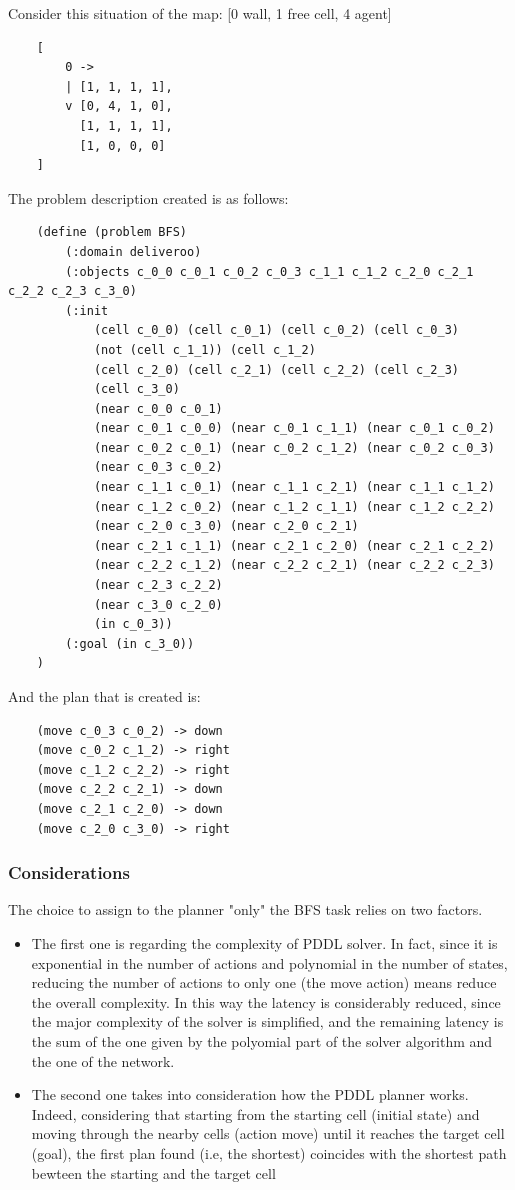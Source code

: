 \documentclass[a4paper, 11pt]{article}
\begin{document}
Consider this situation of the map: [0 wall, 1 free cell, 4 agent]
\begin{verbatim}
    [
        0 ->
        | [1, 1, 1, 1],
        v [0, 4, 1, 0],
          [1, 1, 1, 1],
          [1, 0, 0, 0]
    ]
\end{verbatim}

The problem description created is as follows:
\begin{verbatim}
    (define (problem BFS)
        (:domain deliveroo)
        (:objects c_0_0 c_0_1 c_0_2 c_0_3 c_1_1 c_1_2 c_2_0 c_2_1 c_2_2 c_2_3 c_3_0)
        (:init 
            (cell c_0_0) (cell c_0_1) (cell c_0_2) (cell c_0_3)
            (not (cell c_1_1)) (cell c_1_2)
            (cell c_2_0) (cell c_2_1) (cell c_2_2) (cell c_2_3)
            (cell c_3_0)
            (near c_0_0 c_0_1)
            (near c_0_1 c_0_0) (near c_0_1 c_1_1) (near c_0_1 c_0_2)
            (near c_0_2 c_0_1) (near c_0_2 c_1_2) (near c_0_2 c_0_3)
            (near c_0_3 c_0_2)
            (near c_1_1 c_0_1) (near c_1_1 c_2_1) (near c_1_1 c_1_2)
            (near c_1_2 c_0_2) (near c_1_2 c_1_1) (near c_1_2 c_2_2)
            (near c_2_0 c_3_0) (near c_2_0 c_2_1)
            (near c_2_1 c_1_1) (near c_2_1 c_2_0) (near c_2_1 c_2_2)
            (near c_2_2 c_1_2) (near c_2_2 c_2_1) (near c_2_2 c_2_3)
            (near c_2_3 c_2_2)
            (near c_3_0 c_2_0)
            (in c_0_3))
        (:goal (in c_3_0))
    )
\end{verbatim}

And the plan that is created is:
\begin{verbatim}
    (move c_0_3 c_0_2) -> down
    (move c_0_2 c_1_2) -> right
    (move c_1_2 c_2_2) -> right
    (move c_2_2 c_2_1) -> down
    (move c_2_1 c_2_0) -> down
    (move c_2_0 c_3_0) -> right
\end{verbatim}

\subsubsection{Considerations}

The choice to assign to the planner "only" the BFS task relies on two factors.
\begin{itemize}
    \item The first one is regarding the complexity of PDDL solver. In fact, since it is exponential in the number of actions and polynomial in the number of states, reducing the number of actions to only one (the move action) means reduce the overall complexity. In this way the latency is considerably reduced, since the major complexity of the solver is simplified, and the remaining latency is the sum of the one given by the polyomial part of the solver algorithm and the one of the network.
    \item The second one takes into consideration how the PDDL planner works. Indeed, considering that starting from the starting cell (initial state) and moving through the nearby cells (action move) until it reaches the target cell (goal), the first plan found (i.e, the shortest) coincides with the shortest path bewteen the starting and the target cell
\end{itemize}
\end{document}
